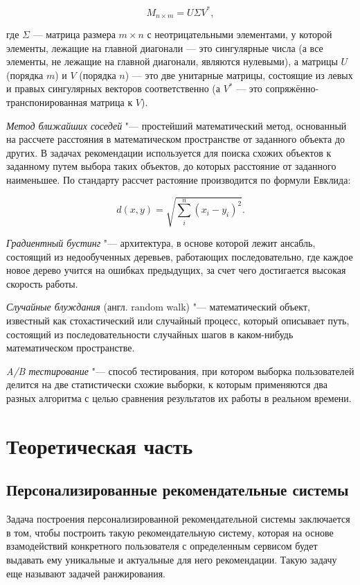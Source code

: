 \documentclass[bachelor, och, coursework]{SCWorks}
\begin{document}
\begin{equation}
    M_{n\times m} = U\Sigma V^*,
\end{equation}

где $\Sigma$  — матрица размера $m\times n$ с неотрицательными элементами, у которой элементы, лежащие на главной диагонали — это сингулярные числа (а все элементы, не лежащие на главной диагонали, являются нулевыми), а матрицы 
$U$ (порядка $m$) и $V$ (порядка $n$) — это две унитарные матрицы, состоящие из левых и правых сингулярных векторов соответственно (а
$V^*$ — это сопряжённо-транспонированная матрица к $V$).

\textit{Метод ближайших соседей} "--- простейший математический метод, основанный на рассчете расстояния
в математическом пространстве от заданного объекта до других. В задачах рекомендации используется для поиска
схожих объектов к заданному путем выбора таких объектов, до которых расстояние от заданного наименьшее.
По стандарту рассчет растояние производится по формули Евклида:

\begin{equation}
    d(x, y) = \sqrt{\sum_i^n (x_i - y_i)^2}.
\end{equation}

\textit{Градиентный бустинг} "--- архитектура, в основе которой лежит ансабль, состоящий из недообученных деревьев,
работающих последовательно, где каждое новое дерево учится на ошибках предыдущих, за счет чего достигается высокая
скорость работы.

\textit{Случайные блуждания} (англ. random walk) "---  математический объект, известный как стохастический или случайный процесс, который описывает путь, состоящий из последовательности случайных шагов в каком-нибудь математическом пространстве.

\textit{A/B тестирование} "--- способ тестирования, при котором выборка пользователей делится на две статистически
схожие выборки, к которым применяются два разных алгоритма с целью сравнения результатов их работы в реальном времени.

\section{Теоретическая часть}
\subsection{Персонализированные рекомендательные системы}
Задача построения персонализированной рекомендательной системы заключается в том, чтобы построить такую рекомендательную
систему, которая на основе взамодействий конкретного пользователя с определенным сервисом будет выдавать ему
уникальные и актуальные для него рекомендации. Такую задачу еще называют задачей ранжирования.
\end{document}
